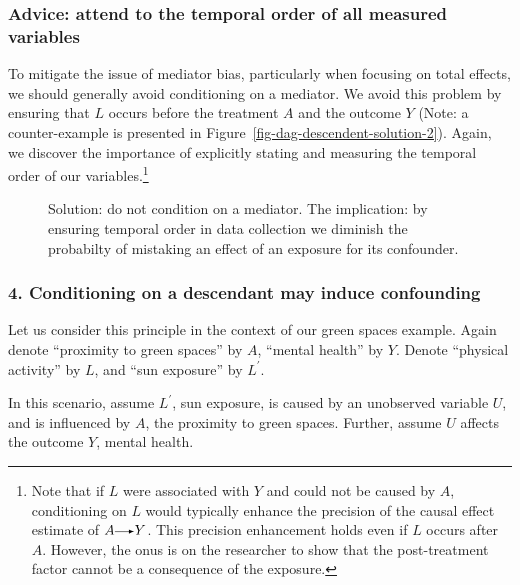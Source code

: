 \documentclass[
  singlecolumn]{article}
\renewcommand{\rightarrow}{\tikz[baseline=-0.5ex] \draw[-latex] (0,0) -- (0.5,0);}
\renewcommand{\to}{\rightarrow}
\begin{document}
\subsubsection{Advice: attend to the temporal order of all measured
variables}\label{advice-attend-to-the-temporal-order-of-all-measured-variables-2}

To mitigate the issue of mediator bias, particularly when focusing on
total effects, we should generally avoid conditioning on a mediator. We
avoid this problem by ensuring that \(L\) occurs before the treatment
\(A\) and the outcome \(Y\) (Note: a counter-example is presented in
Figure~\ref{fig-dag-descendent-solution-2}). Again, we discover the
importance of explicitly stating and measuring the temporal order of our
variables.\footnote{Note that if \(L\) were associated with \(Y\) and
  could not be caused by \(A\), conditioning on \(L\) would typically
  enhance the precision of the causal effect estimate of \(A \to Y\).
  This precision enhancement holds even if \(L\) occurs after \(A\).
  However, the onus is on the researcher to show that the post-treatment
  factor cannot be a consequence of the exposure.}

\begin{figure}


\caption{\label{fig-dag-mediator-solution}Solution: do not condition on
a mediator. The implication: by ensuring temporal order in data
collection we diminish the probabilty of mistaking an effect of an
exposure for its confounder.}

\end{figure}%

\subsubsection{4. Conditioning on a descendant may induce
confounding}\label{conditioning-on-a-descendant-may-induce-confounding}

Let us consider this principle in the context of our green spaces
example. Again denote ``proximity to green spaces'' by \(A\), ``mental
health'' by \(Y\). Denote ``physical activity'' by \(L\), and ``sun
exposure'' by \(L^\prime\).

In this scenario, assume \(L^\prime\), sun exposure, is caused by an
unobserved variable \(U\), and is influenced by \(A\), the proximity to
green spaces. Further, assume \(U\) affects the outcome \(Y\), mental
health.
\end{document}
